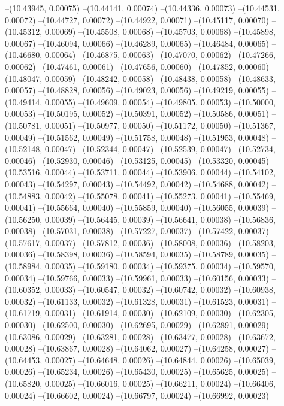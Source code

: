 --(10.43945, 0.00075)
--(10.44141, 0.00074)
--(10.44336, 0.00073)
--(10.44531, 0.00072)
--(10.44727, 0.00072)
--(10.44922, 0.00071)
--(10.45117, 0.00070)
--(10.45312, 0.00069)
--(10.45508, 0.00068)
--(10.45703, 0.00068)
--(10.45898, 0.00067)
--(10.46094, 0.00066)
--(10.46289, 0.00065)
--(10.46484, 0.00065)
--(10.46680, 0.00064)
--(10.46875, 0.00063)
--(10.47070, 0.00062)
--(10.47266, 0.00062)
--(10.47461, 0.00061)
--(10.47656, 0.00060)
--(10.47852, 0.00060)
--(10.48047, 0.00059)
--(10.48242, 0.00058)
--(10.48438, 0.00058)
--(10.48633, 0.00057)
--(10.48828, 0.00056)
--(10.49023, 0.00056)
--(10.49219, 0.00055)
--(10.49414, 0.00055)
--(10.49609, 0.00054)
--(10.49805, 0.00053)
--(10.50000, 0.00053)
--(10.50195, 0.00052)
--(10.50391, 0.00052)
--(10.50586, 0.00051)
--(10.50781, 0.00051)
--(10.50977, 0.00050)
--(10.51172, 0.00050)
--(10.51367, 0.00049)
--(10.51562, 0.00049)
--(10.51758, 0.00048)
--(10.51953, 0.00048)
--(10.52148, 0.00047)
--(10.52344, 0.00047)
--(10.52539, 0.00047)
--(10.52734, 0.00046)
--(10.52930, 0.00046)
--(10.53125, 0.00045)
--(10.53320, 0.00045)
--(10.53516, 0.00044)
--(10.53711, 0.00044)
--(10.53906, 0.00044)
--(10.54102, 0.00043)
--(10.54297, 0.00043)
--(10.54492, 0.00042)
--(10.54688, 0.00042)
--(10.54883, 0.00042)
--(10.55078, 0.00041)
--(10.55273, 0.00041)
--(10.55469, 0.00041)
--(10.55664, 0.00040)
--(10.55859, 0.00040)
--(10.56055, 0.00039)
--(10.56250, 0.00039)
--(10.56445, 0.00039)
--(10.56641, 0.00038)
--(10.56836, 0.00038)
--(10.57031, 0.00038)
--(10.57227, 0.00037)
--(10.57422, 0.00037)
--(10.57617, 0.00037)
--(10.57812, 0.00036)
--(10.58008, 0.00036)
--(10.58203, 0.00036)
--(10.58398, 0.00036)
--(10.58594, 0.00035)
--(10.58789, 0.00035)
--(10.58984, 0.00035)
--(10.59180, 0.00034)
--(10.59375, 0.00034)
--(10.59570, 0.00034)
--(10.59766, 0.00033)
--(10.59961, 0.00033)
--(10.60156, 0.00033)
--(10.60352, 0.00033)
--(10.60547, 0.00032)
--(10.60742, 0.00032)
--(10.60938, 0.00032)
--(10.61133, 0.00032)
--(10.61328, 0.00031)
--(10.61523, 0.00031)
--(10.61719, 0.00031)
--(10.61914, 0.00030)
--(10.62109, 0.00030)
--(10.62305, 0.00030)
--(10.62500, 0.00030)
--(10.62695, 0.00029)
--(10.62891, 0.00029)
--(10.63086, 0.00029)
--(10.63281, 0.00028)
--(10.63477, 0.00028)
--(10.63672, 0.00028)
--(10.63867, 0.00028)
--(10.64062, 0.00027)
--(10.64258, 0.00027)
--(10.64453, 0.00027)
--(10.64648, 0.00026)
--(10.64844, 0.00026)
--(10.65039, 0.00026)
--(10.65234, 0.00026)
--(10.65430, 0.00025)
--(10.65625, 0.00025)
--(10.65820, 0.00025)
--(10.66016, 0.00025)
--(10.66211, 0.00024)
--(10.66406, 0.00024)
--(10.66602, 0.00024)
--(10.66797, 0.00024)
--(10.66992, 0.00023)
